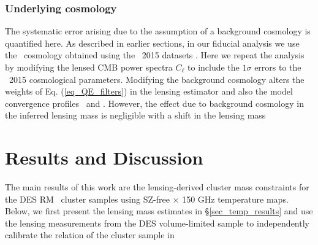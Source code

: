 \subsubsection{Underlying cosmology}\label{subsec_others}
The systematic error arising due to the assumption of a background cosmology is quantified here.
As described in earlier sections, in our fiducial analysis we use the \lcdm\ cosmology obtained using the \planck\ 2015 datasets \citep{planck15-13}. 
Here we repeat the analysis by modifying the lensed CMB power spectra $C_{\ell}$ to include the $1\sigma$ errors to the \planck\ 2015 cosmological parameters.
Modifying the background cosmology alters the weights of Eq. (\ref{eq_QE_filters}) in the lensing estimator and also the model convergence profiles \kappaonehalomz\ and \kappatwohalomz. 
However, the effect due to background cosmology in the inferred lensing mass is negligible with a shift in the lensing mass %

  \section{Results and Discussion}\label{mqe_sec_results}

The main results of this work are the lensing-derived cluster mass constraints for the DES RM \whichyear\ cluster samples using \sptpol{} SZ-free $\times$ 150 GHz temperature maps.
Below, we first present the lensing mass estimates in \S\ref{sec_temp_results} and use the lensing measurements from the DES \whichyear{} volume-limited sample to independently calibrate the \ML{} relation of the cluster sample in %
